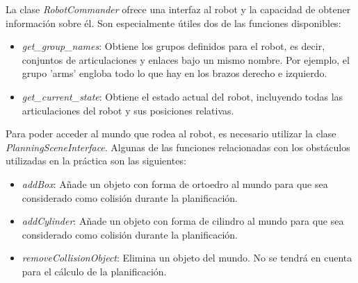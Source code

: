 \documentclass[12pt,spanish,chapterprefix, numbers=noenddot]{book}
\numberwithin{equation}{section}
\numberwithin{figure}{section}
\begin{document}
La clase \textit{RobotCommander} ofrece una interfaz al robot y la capacidad de obtener información sobre él. Son especialmente útiles dos de las funciones disponibles: 
\begin{itemize}
\item \textit{get\_group\_names}: Obtiene los grupos definidos para el robot, es decir, conjuntos de articulaciones y enlaces bajo un mismo nombre.  Por ejemplo,  el grupo 'arms' engloba todo lo que hay en los brazos derecho e izquierdo. 
\item \textit{get\_current\_state}: Obtiene el estado actual del robot, incluyendo todas las articulaciones del robot y sus posiciones relativas. 
\end{itemize}
\newpage
Para poder acceder al mundo que rodea al robot, es necesario utilizar la clase \textit{PlanningSceneInterface}. Algunas de las funciones relacionadas con los obstáculos utilizadas en la práctica son las siguientes: 
\begin{itemize}
\item \textit{addBox}: Añade un objeto con forma de ortoedro al mundo para que sea considerado como colisión durante la planificación. 
\item \textit{addCylinder}: Añade un objeto con forma de cilindro al mundo para que sea considerado como colisión durante la planificación. 
\item \textit{removeCollisionObject}: Elimina un objeto del mundo. No se tendrá en cuenta para el cálculo de la planificación.  
\end{itemize}
\end{document}
